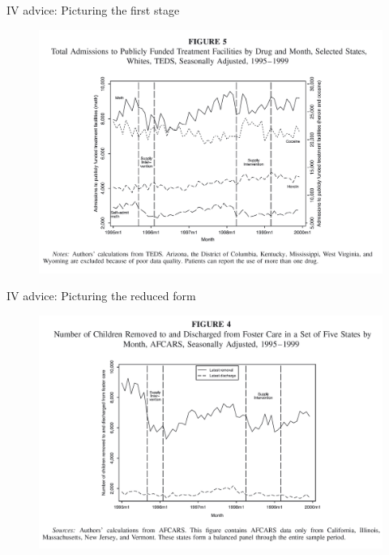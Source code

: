 \documentclass{beamer}
\begin{document}
\begin{frame}{IV advice: Picturing the first stage}
	
	\begin{figure}
	\includegraphics[scale=0.15]{./lecture_includes/keith_3.png}
	\end{figure}
	
\end{frame}

\begin{frame}{IV advice: Picturing the reduced form}
	
	\begin{figure}
	\includegraphics[scale=0.15]{./lecture_includes/keith_2.png}
	\end{figure}
	
\end{frame}
\end{document}
